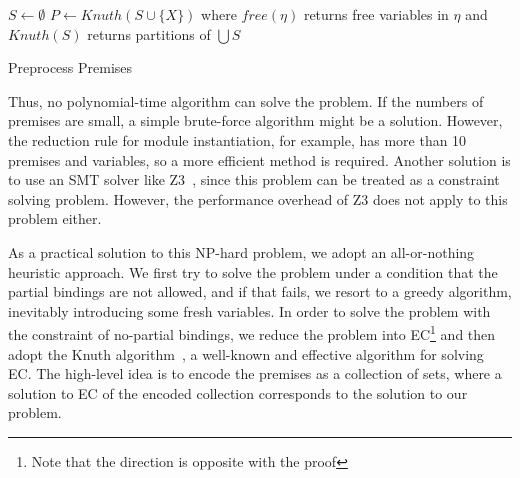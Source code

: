 \begin{algorithm}[t]
\DontPrintSemicolon
{}
$S \gets \emptyset$\;
$P \gets \mathit{Knuth}(S \cup \{X\})$\;
where $\mathit{free}(\eta)$ returns free variables in $\eta$ and
$\mathit{Knuth}(S)$ returns partitions of $\bigcup S$
\caption{Preprocess Premises}
\label{algo:preminfer}
\end{algorithm}

\medskip
Thus, no polynomial-time algorithm can solve the problem.
If the numbers of premises are small, a simple brute-force algorithm might be a solution.
However, the reduction rule for module instantiation, for example,
has more than 10 premises and variables, so a more efficient method is required.
Another solution is to use an SMT solver like Z3~\cite{z3},
since this problem can be treated as a constraint solving problem.
However, the performance overhead of Z3 does not apply to this problem either.

As a practical solution to this NP-hard problem,
we adopt an all-or-nothing heuristic approach.
We first try to solve the problem under a condition that the partial bindings are not allowed,
and if that fails, we resort to a greedy algorithm, inevitably introducing some fresh variables.
In order to solve the problem with the constraint of no-partial bindings,
we reduce the problem into EC\footnote{Note that the direction is opposite with
the proof} and then adopt the Knuth algorithm~\cite{knuth2000dancing},
a well-known and effective algorithm for solving EC.
The high-level idea is to encode the premises as a collection of sets,
where a solution to EC of the encoded collection corresponds to the solution to our problem.


